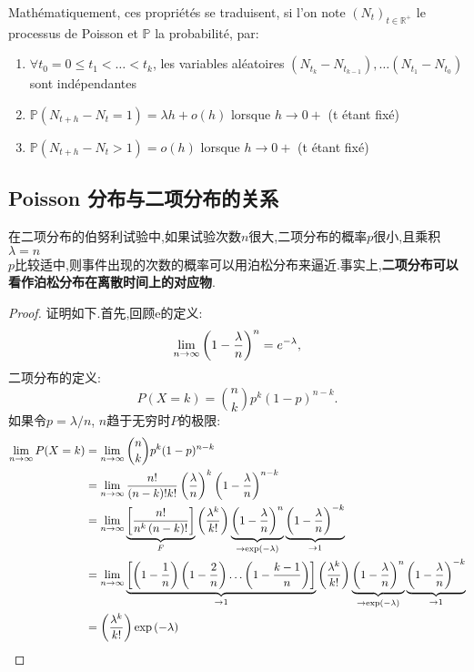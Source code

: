\documentclass{article}
\begin{document}
Math\'ematiquement, ces propri\'et\'es se traduisent, si l'on note $(N_{t})_{{t\in {\mathbb  {R}}^{+}}}$ le processus de Poisson et ${\mathbb  {P}}$ la probabilit\'e, par:
\begin{enumerate}
\item $\forall t_{0}=0\leq t_{1}<\dots <t_{k}$, les variables al\'eatoires $(N_{{t_{k}}}-N_{{t_{{k-1}}}}),\dots (N_{{t_{1}}}-N_{{t_{0}}})$ sont ind\'ependantes
\item ${\mathbb{P}}(N_{{t+h}}-N_{t}=1)=\lambda h+o(h)$ lorsque $h\to 0+$ (t \'etant fix\'e)
\item ${\mathbb{P}}(N_{{t+h}}-N_{t}>1)=o(h)$ lorsque $h\to 0+$ (t \'etant fix\'e)
\end{enumerate}

\subsection{Poisson 分布与二项分布的关系}
在二项分布的伯努利试验中,如果试验次数$n$很大,二项分布的概率$p$很小,且乘积$\lambda = n$ \\$p$比较适中,则事件出现的次数的概率可以用泊松分布来逼近.事实上,\textbf{二项分布可以看作泊松分布在离散时间上的对应物}.
\begin{proof}
证明如下.首先,回顾e的定义:
$$
\lim _{{n\to \infty }}\left(1-{\lambda  \over n}\right)^{n}=e^{{-\lambda }},
$$
二项分布的定义:
$$
P(X=k)={n \choose k}p^{k}(1-p)^{{n-k}}.
$$
如果令$p=\lambda /n$, $n$趋于无穷时$P$的极限:
$$
\begin{aligned}
\lim_{{n \to \infty }}P(X=k) & =\lim _{{n\to \infty }}{n \choose k}p^{k}(1-p)^{{n-k}}\\
& = \lim _{{n\to \infty }}{n! \over (n-k)!k!}\left({\lambda \over n}\right)^{k}\left(1-{\lambda \over n}\right)^{{n-k}}\\
& = \lim _{{n\to \infty }}\underbrace {\left[{\frac {n!}{n^{k}\left(n-k\right)!}}\right]}_{F}\left({\frac {\lambda ^{k}}{k!}}\right)\underbrace {\left(1-{\frac {\lambda }{n}}\right)^{n}}_{{\to \exp \left(-\lambda \right)}}\underbrace {\left(1-{\frac {\lambda }{n}}\right)^{{-k}}}_{{\to 1}}\\
& = \lim _{{n\to \infty }}\underbrace {\left[\left(1-{\frac {1}{n}}\right)\left(1-{\frac {2}{n}}\right)\ldots \left(1-{\frac {k-1}{n}}\right)\right]}_{{\to 1}}\left({\frac {\lambda ^{k}}{k!}}\right)\underbrace {\left(1-{\frac {\lambda }{n}}\right)^{n}}_{{\to \exp \left(-\lambda \right)}}\underbrace {\left(1-{\frac {\lambda }{n}}\right)^{{-k}}}_{{\to 1}}\\
& = \left({\frac {\lambda ^{k}}{k!}}\right)\exp \left(-\lambda \right)
\end{aligned}
$$
\end{proof}
\end{document}
